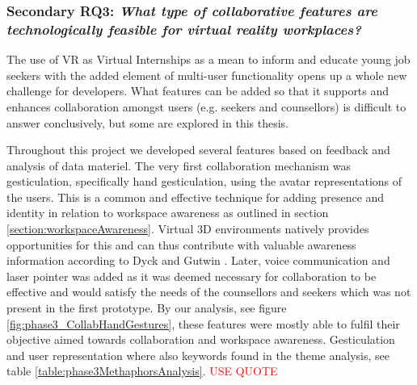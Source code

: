 




\subsubsection{Secondary RQ3: \textit{What type of collaborative features are technologically feasible for virtual reality workplaces?}} 
\label{discussion:RQ3}

The use of VR as Virtual Internships as a mean to inform and educate young job seekers with the added element of multi-user functionality opens up a whole new challenge for developers. What features can be added so that it supports and enhances collaboration amongst users (e.g. seekers and counsellors) is difficult to answer conclusively, but some are explored in this thesis.

Throughout this project we developed several features based on feedback and analysis of data materiel. The very first collaboration mechanism was gesticulation, specifically hand gesticulation, using the avatar representations of the users. This is a common and effective technique for adding presence and identity in relation to workspace awareness as outlined in section \ref{section:workspaceAwareness}. Virtual 3D environments natively provides opportunities for this and can thus contribute with valuable awareness information according to Dyck
and Gutwin \cite{dyck2002groupspace}. Later, voice communication and laser pointer was added as it was deemed necessary for collaboration to be effective and would satisfy the needs of the counsellors and seekers which was not present in the first prototype. By our analysis, see figure \ref{fig:phase3_CollabHandGestures}, these features were mostly able to fulfil their objective aimed towards collaboration and workspace awareness. Gesticulation and user representation where also keywords found in the theme analysis, see table \ref{table:phase3MethaphorsAnalysis}.
\textcolor{red}{USE QUOTE}

